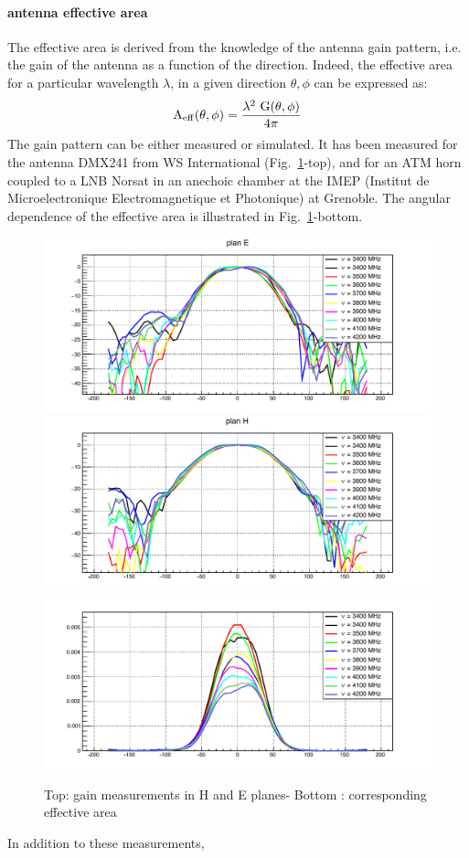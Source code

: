 \paragraph{antenna effective area}
The effective area is derived from the knowledge of the antenna gain pattern, i.e. the gain of the antenna as a
function of the direction.
Indeed, the effective area for a particular wavelength $\lambda$, in  a given direction $\theta, \phi $ can be expressed as:
\begin{eqnarray} \label{aeff}
\rm A_{eff} (\theta, \phi) = {{\lambda^2\ G(\theta, \phi)}\over{4 \pi} } 
\end{eqnarray}
The gain pattern can be either measured or simulated. 
 It has been measured for the antenna DMX241 from WS International (Fig.~\ref{fig:wsi-imep}-top),  and for an ATM horn coupled to a LNB Norsat
  in an anechoic chamber at the IMEP (Institut de
Microelectronique Electromagnetique et Photonique) at
Grenoble. The angular dependence of the effective area is illustrated  in Fig.~\ref{fig:wsi-imep}-bottom.
\begin{figure}[ht]
\centering
\includegraphics[width=0.49\linewidth]{../plots/C_wsi_g_E.pdf}
\includegraphics[width=0.49\linewidth]{../plots/C_wsi_g_H.pdf}\\
\includegraphics[width=0.55\linewidth]{../plots/C_wsi_A_EH.pdf}\\
\caption{Top: gain measurements in H and E planes- Bottom : corresponding effective area}
\label{fig:wsi-imep}
\end{figure}  
 In addition to these measurements, 
